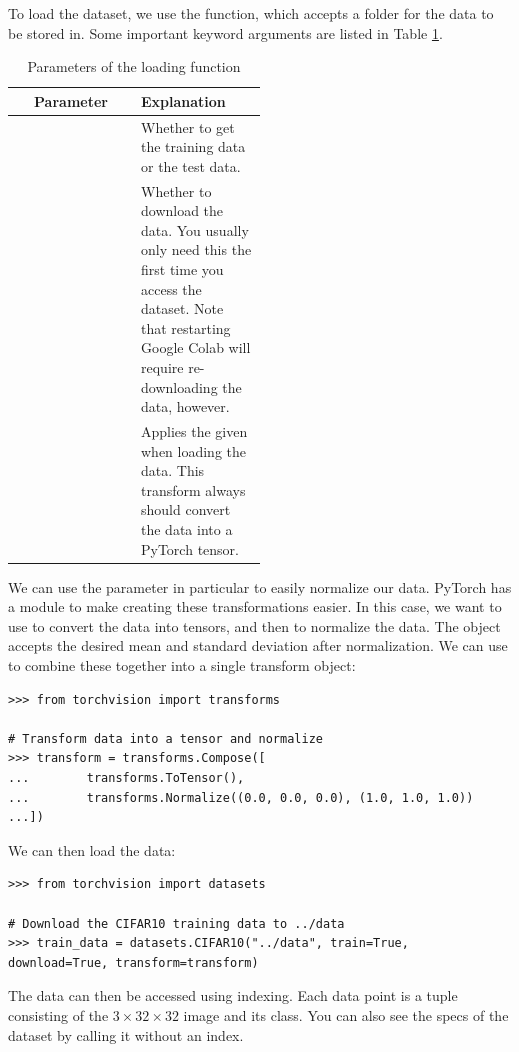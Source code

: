 To load the dataset, we use the  function, which accepts a folder for the data to be stored in.
Some important keyword arguments are listed in Table \ref{table:deeplearning:download_data}.
\begin{table}[H]
	\centering
	\begin{tabular}{c|p{0.5\linewidth}}
	Parameter & Explanation \\
	\hline
	\li{train} & Whether to get the training data or the test data.\\
	\li{download} & Whether to download the data.
	You usually only need this the first time you access the dataset.
	Note that restarting Google Colab will require re-downloading the data, however.\\
	\li{transform} & Applies the given \li{transform} when loading the data.
	This transform always should convert the data into a PyTorch tensor.
	\end{tabular}
	\caption{Parameters of the  loading function}\label{table:deeplearning:download_data}
\end{table}
We can use the  parameter in particular to easily normalize our data.
PyTorch has a module  to make creating these transformations easier.
In this case, we want to use  to convert the data into tensors, and then  to normalize the data.
The  object accepts the desired mean and standard deviation after normalization.
We can use  to combine these together into a single transform object:
\begin{lstlisting}
>>> from torchvision import transforms

# Transform data into a tensor and normalize
>>> transform = transforms.Compose([
...        transforms.ToTensor(),
...        transforms.Normalize((0.0, 0.0, 0.0), (1.0, 1.0, 1.0))
...])
\end{lstlisting}
We can then load the data:
\begin{lstlisting}
>>> from torchvision import datasets

# Download the CIFAR10 training data to ../data
>>> train_data = datasets.CIFAR10("../data", train=True, download=True, transform=transform)
\end{lstlisting}
The data can then be accessed using indexing.
Each data point is a tuple consisting of the $3\times32\times32$ image and its class.
You can also see the specs of the dataset by calling it without an index.

